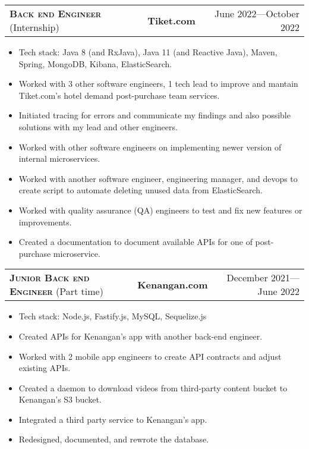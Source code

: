 \documentclass[10pt]{article}
\makeatletter
\newcommand{\workExpVspace}{1em}
\newcommand{\workExp}[6]{
    \noindent \begin{tabularx}{\textwidth}{@{}X c|r}
        \textbf{\textsc{#5}} (#2) & \textbf{#1} & #3---#4
    \end{tabularx}

    {#6}
    \vspace{\workExpVspace}
}
\makeatother
\begin{document}
\workExp
    {Tiket.com}
    {Internship}
    {June 2022}
    {October 2022}
    {Back end Engineer}
    {
        \begin{itemize}
            \item Tech stack: Java 8 (and RxJava), Java 11 (and Reactive Java), Maven, Spring,
                MongoDB, Kibana, ElasticSearch.
            \item Worked with 3 other software engineers, 1 tech lead to improve and mantain
                Tiket.com's hotel demand post-purchase team services.
            \item Initiated tracing for errors and communicate my findings and also possible
                solutions with my lead and other engineers.
            \item Worked with other software engineers on implementing newer version of internal
                microservices.
            \item Worked with another software engineer, engineering manager, and devops to create
                script to automate deleting unused data from ElasticSearch.
            \item Worked with quality assurance (QA) engineers to test and fix new features or
                improvements.
            \item Created a documentation to document available APIs for one of post-purchase
                microservice.
        \end{itemize}
    }

\workExp
    {Kenangan.com}
    {Part time}
    {December 2021}
    {June 2022}
    {Junior Back end Engineer}
    {
        \begin{itemize}
            \item Tech stack: Node.js, Fastify.js, MySQL, Sequelize.js
            \item Created APIs for Kenangan's app with another back-end engineer.
            \item Worked with 2 mobile app engineers to create API contracts and adjust existing
                APIs.
            \item Created a daemon to download videos from third-party content bucket to Kenangan's
                S3 bucket.
            \item Integrated a third party service to Kenangan's app.
            \item Redesigned, documented, and rewrote the database.
        \end{itemize}
    }
\end{document}
